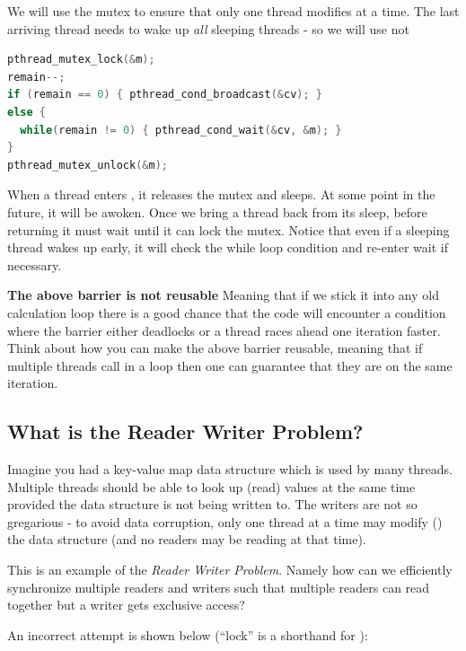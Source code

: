 We will use the mutex to ensure that only one thread modifies  at a time. The last arriving thread needs to wake up \emph{all} sleeping threads - so we will use  not 

\begin{lstlisting}[language=C]
pthread_mutex_lock(&m);
remain--; 
if (remain == 0) { pthread_cond_broadcast(&cv); }
else {
  while(remain != 0) { pthread_cond_wait(&cv, &m); }
}
pthread_mutex_unlock(&m);
\end{lstlisting}

When a thread enters , it releases the mutex and sleeps. At some point in the future, it will be awoken. Once we bring a thread back from its sleep, before returning it must wait until it can lock the mutex. Notice that even if a sleeping thread wakes up early, it will check the while loop condition and re-enter wait if necessary.

\textbf{The above barrier is not reusable} Meaning that if we stick it into any old calculation loop there is a good chance that the code will encounter a condition where the barrier either deadlocks or a thread races ahead one iteration faster. Think about how you can make the above barrier reusable, meaning that if multiple threads call  in a loop then one can guarantee that they are on the same iteration.

\subsection{What is the Reader Writer Problem?}\label{what-is-the-reader-writer-problem}

Imagine you had a key-value map data structure which is used by many threads. Multiple threads should be able to look up (read) values at the same time provided the data structure is not being written to. The writers are not so gregarious - to avoid data corruption, only one thread at a time may modify () the data structure (and no readers may be reading at that time).

This is an example of the \emph{Reader Writer Problem}. Namely how can we efficiently synchronize multiple readers and writers such that multiple readers can read together but a writer gets exclusive access?

An incorrect attempt is shown below (``lock'' is a shorthand for ):

